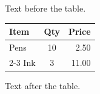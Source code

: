 \documentclass{article}
\begin{document}
Text before the table.

\begin{tabular}{|l|c|r|}\hline Item & Qty & Price\\\hline Pens & 10 & 2.50\\\cline{2-3} Ink & 3 & 11.00\\\hline\end{tabular}

Text after the table.
\end{document}
